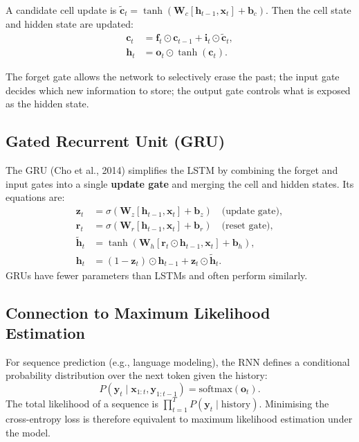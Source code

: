 \documentclass{tufte-handout}
\begin{document}
A candidate cell update is $\tilde{\mathbf{c}}_t = \tanh(\mathbf{W}_c [\mathbf{h}_{t-1}, \mathbf{x}_t] + \mathbf{b}_c)$. Then the cell state and hidden state are updated:
\begin{align}
    \mathbf{c}_t &= \mathbf{f}_t \odot \mathbf{c}_{t-1} + \mathbf{i}_t \odot \tilde{\mathbf{c}}_t, \\
    \mathbf{h}_t &= \mathbf{o}_t \odot \tanh(\mathbf{c}_t).
\end{align}

The forget gate allows the network to selectively erase the past; the input gate decides which new information to store; the output gate controls what is exposed as the hidden state.

\subsection{Gated Recurrent Unit (GRU)}

The GRU (Cho et al., 2014) simplifies the LSTM by combining the forget and input gates into a single \textbf{update gate} and merging the cell and hidden states. Its equations are:
\begin{align}
    \mathbf{z}_t &= \sigma(\mathbf{W}_z [\mathbf{h}_{t-1}, \mathbf{x}_t] + \mathbf{b}_z) \quad \text{(update gate)}, \\
    \mathbf{r}_t &= \sigma(\mathbf{W}_r [\mathbf{h}_{t-1}, \mathbf{x}_t] + \mathbf{b}_r) \quad \text{(reset gate)}, \\
    \tilde{\mathbf{h}}_t &= \tanh(\mathbf{W}_h [\mathbf{r}_t \odot \mathbf{h}_{t-1}, \mathbf{x}_t] + \mathbf{b}_h), \\
    \mathbf{h}_t &= (1 - \mathbf{z}_t) \odot \mathbf{h}_{t-1} + \mathbf{z}_t \odot \tilde{\mathbf{h}}_t.
\end{align}
GRUs have fewer parameters than LSTMs and often perform similarly.

\subsection{Connection to Maximum Likelihood Estimation}

For sequence prediction (e.g., language modeling), the RNN defines a conditional probability distribution over the next token given the history:
\[
P(\mathbf{y}_t \mid \mathbf{x}_{1:t}, \mathbf{y}_{1:t-1}) = \text{softmax}(\mathbf{o}_t).
\]
The total likelihood of a sequence is $\prod_{t=1}^T P(\mathbf{y}_t \mid \text{history})$. Minimising the cross-entropy loss is therefore equivalent to maximum likelihood estimation under the model.
\end{document}
